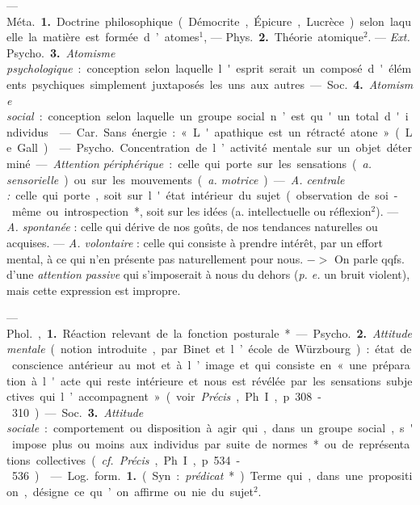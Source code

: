 \begin{itemize}[leftmargin=1cm, label=, itemsep=1pt]
{ —  \si{Méta.} {\bf 1.} Doctrine philosophique (Démocrite, Épicure,
Lucrèce) selon laquelle la matière est
formée d’atomes$^1$, — \si{Phys.} {\bf 2.} Théorie
atomique$^2$. — {\it Ext.} \si{Psycho.} {\bf 3.} {\it Atomisme psychologique} : conception
selon laquelle l'esprit serait un
composé d'éléments psychiques
simplement juxtaposés les uns aux
autres. — \si{Soc.} {\bf 4.} {\it Atomisme social} :
conception selon laquelle un groupe
social n’est qu'un total d'individus.

 — \si{Car.} Sans énergie : « L'apathique est un rétracté atone »
(Le Gall).

 — \si{Psycho.} Concentration
de l’activité mentale sur un objet
déterminé. — {\it Attention périphérique} : celle qui porte sur les sensations
({\it a. sensorielle}) ou sur les mouvements ({\it a. motrice}). — {\it A. centrale :}
celle qui porte, soit sur l'état intérieur du sujet (observation de
soi-même ou introspection*}, soit sur les
idées (a. intellectuelle ou réflexion$^2$).
— {\it A. spontanée} : celle qui dérive de
nos goûts, de nos tendances naturelles ou acquises. — {\it A. volontaire} :
celle qui consiste à prendre intérêt,
par un effort mental, à ce qui n’en
présente pas naturellement pour
nous. $->$ On parle qqfs. d’une
{\it attention passive} qui s'imposerait à
nous du dehors ({\it p. e.} un bruit violent),
mais cette expression est impropre.

 — \si{Phol.}, {\bf 1.} Réaction relevant de la fonction posturale*.

— \si{Psycho.} {\bf 2.} {\it Attitude mentale}
(notion introduite, par Binet et
l’école de Würzbourg) : état de conscience antérieur au mot et à l’image
et qui consiste en « une préparation
à l'acte qui reste intérieure et nous
est révélée par les sensations subjectives qui l’accompagnent » (voir
{\it Précis}, Ph. I, p. 308-310).

— \si{Soc.} {\bf 3.} {\it Attitude sociale} : comportement ou disposition à agir qui,
dans un groupe social, s'impose plus
ou moins aux individus par suite de
normes* ou de représentations collectives ({\it cf.}  {\it Précis}, Ph. I, p. 534-536).

 — \si{Log.} \si{form.} {\bf 1.} (Syn. : {\it prédicat}*). Terme qui, dans
une proposition, désigne ce qu’on affirme
ou nie du sujet$^2$.


\end{itemize}
